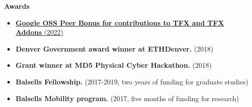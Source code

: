 \documentclass[letterpaper,10pt]{article}
\makeatletter
\newcommand{\resitem}[1]{\item #1 \vspace{-2pt}}
\newcommand{\resheading}[1]{{\large \colorbox{mygrey}{\begin{minipage}{\textwidth}{\textbf{#1 \vphantom{p\^{E}}}}\end{minipage}}}}
\newcommand{\ressubheading}[4]{
\begin{tabular*}{7.0in}{l@{\extracolsep{\fill}}r}
		\textbf{#1} & \textit{#4} \\
\end{tabular*}\vspace{-6pt}}
\makeatother
\begin{document}

\resheading{Awards}
	\begin{itemize}
		\resitem{\href{https://opensource.googleblog.com/2022/03/Announcing-First-Group-of-Google-Open-Source-Peer-Bonus-Winners-in-2022.html}{\textbf{Google OSS Peer Bonus for contributions to TFX and TFX Addons} (2022)}}
		\resitem{\textbf{Denver Government award winner at ETHDenver.} (2018)}
		\resitem{\textbf{Grant winner at MD5 Physical Cyber Hackathon.} (2018)}
		\resitem{\textbf{Balsells Fellowship.} (2017-2019, two years of funding for graduate studies)}
		\resitem{\textbf{Balsells Mobility program.} (2017, five months of funding for research)}
	\end{itemize}
\end{document}

